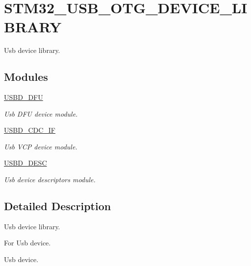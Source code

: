 \hypertarget{group__STM32__USB__OTG__DEVICE__LIBRARY}{}\section{S\+T\+M32\+\_\+\+U\+S\+B\+\_\+\+O\+T\+G\+\_\+\+D\+E\+V\+I\+C\+E\+\_\+\+L\+I\+B\+R\+A\+RY}
\label{group__STM32__USB__OTG__DEVICE__LIBRARY}


Usb device library.  


\subsection*{Modules}
\begin{DoxyCompactItemize}
\item 
\hyperlink{group__USBD__DFU}{U\+S\+B\+D\+\_\+\+D\+FU}
\begin{DoxyCompactList}\small\item\em Usb D\+FU device module. \end{DoxyCompactList}\item 
\hyperlink{group__USBD__CDC__IF}{U\+S\+B\+D\+\_\+\+C\+D\+C\+\_\+\+IF}
\begin{DoxyCompactList}\small\item\em Usb V\+CP device module. \end{DoxyCompactList}\item 
\hyperlink{group__USBD__DESC}{U\+S\+B\+D\+\_\+\+D\+E\+SC}
\begin{DoxyCompactList}\small\item\em Usb device descriptors module. \end{DoxyCompactList}\end{DoxyCompactItemize}


\subsection{Detailed Description}
Usb device library. 

For Usb device.

Usb device.